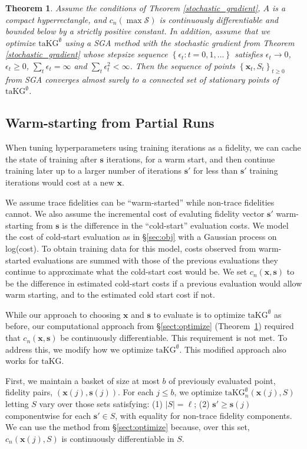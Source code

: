 \documentclass[letterpaper]{article}
\let\Section\S
\newcommand{\cost}{c}
\newcommand{\x}{\mathbf{x}}
\newcommand{\s}{\mathbf{s}}
\renewcommand{\S}{S}
\newcommand{\taKG}{\text{taKG}}
\newcommand{\taKGE}{\text{taKG}^\emptyset}
\newtheorem{theorem}{Theorem}
\numberwithin{equation}{section}
\newcommand{\sectn}[1]{\Section\ref{#1}}
\begin{document}
\begin{theorem}
Assume the conditions of Theorem \ref{stochastic_gradient}, $A$ is a compact hyperrectangle, and $\cost_n(\max \mathcal{S})$
is continuously differentiable and bounded below by a strictly positive constant. In
addition, assume that we optimize $\taKGE$ using a SGA method with the stochastic gradient from Theorem \ref{stochastic_gradient} whose stepsize
sequence $\left\{ \epsilon_{t}:t=0,1,\ldots\right\} $ 
satisfies $\epsilon_{t}\rightarrow0$, $\epsilon_{t}\geq0$,
$\sum_{t}\epsilon_{t}=\infty$ and $\sum_{t}\epsilon_{t}^{2}<\infty$.
Then the sequence of points $\left\{ \x_{t}, \S_{t}\right\} _{t\geq0}$ from SGA
converges almost surely to a connected set of stationary points of $\taKGE$.
\label{t:convergence}
\end{theorem}

\subsection{Warm-starting from Partial Runs}
\label{sect:warm-start}
When tuning hyperparameters using training iterations as a fidelity,
we can cache the state of training after $\s$ iterations, for a warm start, and then continue training later up to a larger number of iterations $\s'$ for less than $\s'$ training iterations would cost at a new $\x$.

We assume trace fidelities can be ``warm-started'' while non-trace fidelities cannot.  We also assume the incremental cost of evaluting fidelity vector $\s'$ warm-starting from $\s$ is the difference in the ``cold-start'' evaluation costs.  We model the cost of cold-start evaluation as in \sectn{sec:obj} with a Gaussian process on log(cost).  To obtain training data for this model, costs observed from warm-started evaluations are summed with those of the previous evaluations they continue to approximate what the cold-start cost would be.  We set $\cost_n(\x,\s)$ to be the difference in estimated cold-start costs if a previous evaluation would allow warm starting, and to the estimated cold start cost if not.

While our approach to choosing $\x$ and $\s$ to evaluate is to optimize $\taKGE$ as before,
our computational approach from \sectn{sect:optimize} 
(Theorem~\ref{t:convergence})
required that $\cost_n(\x,\s)$ be continuously differentiable.  This requirement is not met.
To address this, we modify how we optimize $\taKGE$.
This modified approach also works for $\taKG$.

First, we maintain a basket of size at most $b$ of previously evaluated point, fidelity pairs, $(\x(j),\s(j))$.
For each $j\le b$, we optimize $\taKGE_n(\x(j),\S)$ letting $\S$ vary over those sets satisfying: (1) $|\S| = \ell$; 
(2) $\s' \ge \s(j)$ componentwise for each $\s' \in \S$, 
with equality for non-trace fidelity components. 
We can use the method from \sectn{sect:optimize} because,
over this set, $\cost_n(\x(j),\S)$ is continuously differentiable in $\S$.
\end{document}
